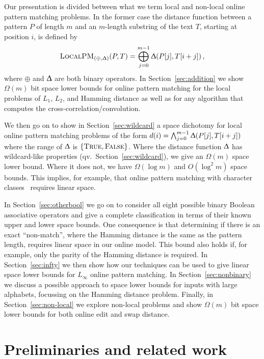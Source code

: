 \documentclass{article}
\renewcommand{\Delta}{\Updelta}
\newcommand{\TRUE}{\textsc{True}\xspace}
\newcommand{\FALSE}{\textsc{False}\xspace}
\newcommand{\local}{\ensuremath{\textsc{LocalPM}}}
\theoremstyle{plain}
\theoremstyle{definition}
\begin{document}
Our presentation is divided between what we term local and non-local online pattern matching problems. In the former case the distance function between a pattern $P$ of length $m$ and an $m$-length substring of the text $T$, starting at position $i$, is defined by
\begin{equation*}
    \local_{(\oplus,\Delta)}(P,T) = \bigoplus_{j=0}^{m-1}\Delta(P[j],T[i+j])\,,
\end{equation*}
where $\oplus$ and $\Delta$ are both binary operators. In Section~\ref{sec:addition} we show $\Omega(m)$ bit space lower bounds for online pattern matching for the local problems of $L_{1}$, $L_{2}$, and Hamming distance as well as for any algorithm that computes the cross-correlation/convolution.

We then go on to show in Section~\ref{sec:wildcard} a  space dichotomy for local online pattern matching problems of the form $d(i)= \bigwedge_{j=0}^{m-1}\Delta(P[j],T[i+j])$
where the range of $\Delta$ is $\{\TRUE,\FALSE\}$. Where the distance function $\Delta$ has wildcard-like properties (qv.~Section~\ref{sec:wildcard}), we give an $\Omega(m)$ space lower bound. Where it does not, we have $\Omega(\log{m})$ and $O(\log^2{m})$ space bounds.  This implies, for example, that online pattern matching with character classes~\cite{LR:2009} requires linear space.

In Section~\ref{sec:otherbool} we go on to consider all eight possible binary Boolean associative operators and give a complete classification in terms of their known upper and lower space bounds.  One consequence is that determining if there is an exact ``non-match'', where the Hamming distance is the same as the pattern length, requires linear space in our online model. This bound also holds if, for example, only the parity of the Hamming distance is required.  In Section~\ref{sec:infty} we then show how our techniques can be used to give linear space lower bounds for  $L_{\infty}$ online pattern matching.  In Section~\ref{sec:nonbinary} we discuss a possible approach to space lower bounds for inputs with large alphabets, focussing on the Hamming distance problem. Finally, in Section~\ref{sec:non-local} we explore non-local problems and show $\Omega(m)$ bit space lower bounds for both online edit and swap distance.


\section{Preliminaries and related work}
\end{document}
